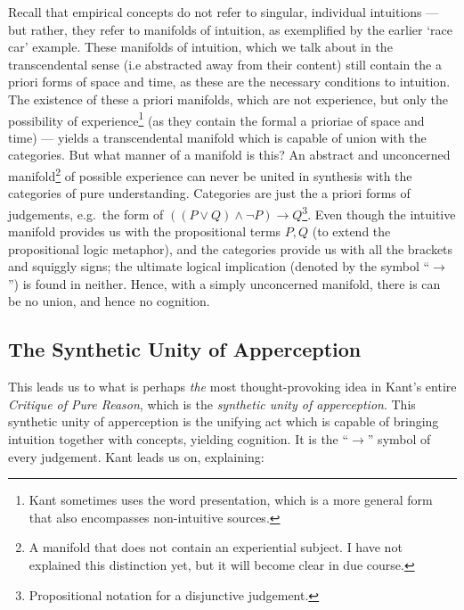 \noindent
Recall that empirical concepts do not refer to singular, individual intuitions --- but rather, they refer to manifolds of intuition, as exemplified by the earlier \enquote*{race car} example. These manifolds of intuition, which we talk about in the transcendental sense (i.e abstracted away from their content) still contain the a priori forms of space and time, as these are the necessary conditions to intuition. The existence of these a priori manifolds, which are not experience, but only the possibility of experience\footnote{Kant sometimes uses the word presentation, which is a more general form that also encompasses non-intuitive sources.} (as they contain the formal a prioriae of space and time) --- yields a transcendental manifold which is capable of union with the categories. But what manner of a manifold is this? An abstract and unconcerned manifold\footnote{A manifold that does not contain an experiential subject. I have not explained this distinction yet, but it will become clear in due course.} of possible experience can never be united in synthesis with the categories of pure understanding. Categories are just the a priori forms of judgements, e.g.\ the form of \(((P \lor Q) \land \neg P) \to Q\)\footnote{Propositional notation for a disjunctive judgement.}. Even though the intuitive manifold provides us with the propositional terms \(P, Q\) (to extend the propositional logic metaphor), and the categories provide us with all the brackets and squiggly signs; the ultimate logical implication (denoted by the symbol \enquote{\(\to\)}) is found in neither. Hence, with a simply unconcerned manifold, there is can be no union, and hence no cognition.

\subsection{The Synthetic Unity of Apperception}

This leads us to what is perhaps \emph{the} most thought-provoking idea in Kant's entire \emph{Critique of Pure Reason}, which is the \emph{synthetic unity of apperception}. This synthetic unity of apperception is the unifying act which is capable of bringing intuition together with concepts, yielding cognition. It is the \enquote{\(\to\)} symbol of every judgement.   Kant leads us on, explaining:

